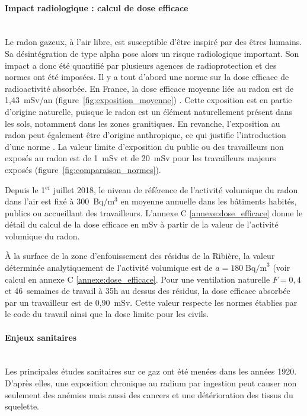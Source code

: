 \documentclass{article}
\begin{document}
\paragraph{Impact radiologique : calcul de dose efficace \\ \\} Le radon gazeux, à l’air libre, est susceptible d’être inspiré par des êtres humains. Sa désintégration de type alpha pose alors un risque radiologique important. Son impact a donc été quantifié par plusieurs agences de radioprotection et des normes ont été imposées. Il y a tout d’abord une norme sur la dose efficace de radioactivité absorbée. En France, la dose efficace moyenne liée au radon est de 1,43~mSv/an (figure~\ref{fig:exposition_moyenne}) \cite{irsn_quelle_nodate}. Cette exposition est en partie d’origine naturelle, puisque le radon est un élément naturellement présent dans les sols, notamment dans les zones granitiques. En revanche, l’exposition au radon peut également être d’origine anthropique, ce qui justifie l'introduction d'une norme \cite{inrs_rayonnements_nodate}. La valeur limite d’exposition du public ou des travailleurs non exposés au radon est de 1~mSv et de 20~mSv pour les travailleurs majeurs exposés (figure~\ref{fig:comparaison_normes}).

Depuis le 1$^{\text{er}}$ juillet 2018, le niveau de référence de l’activité volumique du radon dans l'air est fixé à 300~Bq/m$^3$ en moyenne annuelle \cite{autorite_de_surete_nucleaire_reglementation_nodate} dans les bâtiments habités, publics ou accueillant des travailleurs. L'annexe C \ref{annexe:dose_efficace} donne le détail du calcul de la dose efficace en mSv à partir de la valeur de l'activité volumique du radon.

À la surface de la zone d’enfouissement des résidus de la Ribière, la valeur déterminée analytiquement de l’activité volumique est de $a=180 \; \text{Bq/m}^3$ (voir calcul en annexe C \ref{annexe:dose_efficace}. Pour une ventilation naturelle $F=0,4$ et 46~semaines de travail à 35h au dessus des résidus, la dose efficace absorbée par un travailleur est de 0,90~mSv. Cette valeur respecte les normes établies par le code du travail ainsi que la dose limite pour les civils.

\paragraph{Enjeux sanitaires \\ \\} Les principales études sanitaires sur ce gaz ont été menées dans les années 1920. D’après elles, une exposition chronique au radium par ingestion peut causer non seulement des anémies mais aussi des cancers et une détérioration des tissus du squelette.
\end{document}
